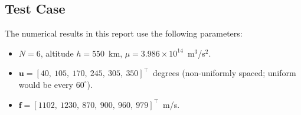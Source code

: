 \subsection{Test Case}

The numerical results in this report use the following parameters:
\begin{itemize}
  \item $N = 6$, altitude $h = 550$~km,
        $\mu = 3.986 \times 10^{14}$~m$^3$/s$^2$.
  \item $\mathbf{u} = [40,\ 105,\ 170,\ 245,\ 305,\ 350]^{\top}$~degrees
        (non-uniformly spaced; uniform would be every $60^{\circ}$).
  \item $\mathbf{f} = [1102,\ 1230,\ 870,\ 900,\ 960,\ 979]^{\top}$~m/s.
\end{itemize}

